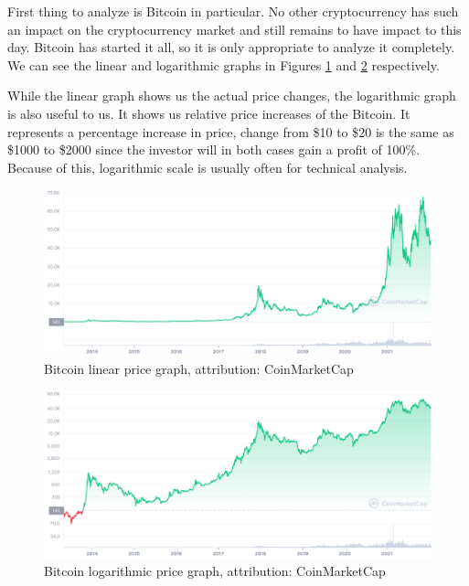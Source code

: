 First thing to analyze is Bitcoin in particular. No other cryptocurrency has such an impact on the cryptocurrency market and still remains to have impact to this day. Bitcoin has started it all, so it is only appropriate to analyze it completely. We can see the linear and logarithmic graphs in Figures \ref{btc-linear-figure} and \ref{btc-log-figure} respectively.

While the linear graph shows us the actual price changes, the logarithmic graph is also useful to us. It shows us relative price increases of the Bitcoin. It represents a percentage increase in price, change from \$10 to \$20 is the same as \$1000 to \$2000 since the investor will in both cases gain a profit of 100\%. Because of this, logarithmic scale is usually often for technical analysis.

\begin{figure}[!hbt]
    \centering
    \includegraphics[width=\columnwidth]{figures/BTC_ALL_linear.png}
    \caption{Bitcoin linear price graph, attribution: CoinMarketCap~\cite{coinmarketcap}}
    \label{btc-linear-figure}
\end{figure}

\begin{figure}[!hbt]
    \centering
    \includegraphics[width=\columnwidth]{figures/BTC_ALL_log.png}
    \caption{Bitcoin logarithmic price graph, attribution: CoinMarketCap~\cite{coinmarketcap}}
    \label{btc-log-figure}
\end{figure}

